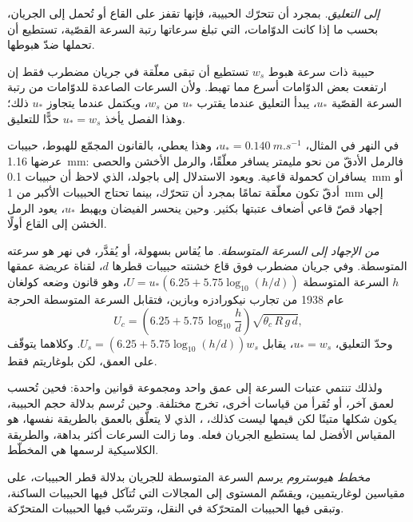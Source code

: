 \emph{إلى التعليق.} بمجرد أن تتحرّك الحبيبة، فإنها تقفز على القاع أو تُحمل إلى الجريان، بحسب ما إذا كانت الدوّامات، التي تبلغ سرعاتها رتبة السرعة القصّية، تستطيع أن تحملها ضدّ هبوطها.

\begin{proposition}\label{prop:b1:erosion-transport:suspension}
حبيبة ذات سرعة هبوط $w_s$ تستطيع أن تبقى معلّقة في جريان مضطرب فقط إن ارتفعت بعض الدوّامات أسرع مما تهبط. ولأن السرعات الصاعدة للدوّامات من رتبة السرعة القصّية $u_*$، يبدأ التعليق عندما يقترب $u_*$ من $w_s$، ويكتمل عندما يتجاوز $u_*$ ذلك؛ وهذا الفصل يأخذ $u_* = w_s$ حدًّا للتعليق.
\end{proposition}
\admitted

في النهر في المثال، $u_* = \qty{0.140}{m.s^{-1}}$، وهذا يعطي، بالقانون المجمّع للهبوط، حبيبات عرضها \qty{1.16}{mm}: فالرمل الأدقّ من نحو مليمتر يسافر معلّقًا، والرمل الأخشن والحصى يسافران كحمولة قاعية. ويعود الاستدلال إلى باجولد، الذي لاحظ أن حبيبات \qty{0.1}{mm} أو أدقّ تكون معلّقة تمامًا بمجرد أن تتحرّك، بينما تحتاج الحبيبات الأكبر من \qty{1}{mm} إلى إجهاد قصّ قاعي أضعاف عتبتها بكثير. وحين ينحسر الفيضان ويهبط $u_*$، يعود الرمل الخشن إلى القاع أولًا.

\emph{من الإجهاد إلى السرعة المتوسطة.} ما يُقاس بسهولة، أو يُقدَّر، في نهر هو سرعته المتوسطة. وفي جريان مضطرب فوق قاع خشنته حبيبات قطرها $d$، لقناة عريضة عمقها $h$ السرعة المتوسطة $U = u_*\left(6.25 + 5.75\log_{10}(h/d)\right)$، وهو قانون وضعه كولغان عام 1938 من تجارب نيكورادزه وبازين، فتقابل  السرعة المتوسطة الحرجة
\[
  U_c = \left(6.25 + 5.75\,\log_{10}\frac{h}{d}\right)\sqrt{\theta_c\,R\,g\,d},
\]
وحدّ التعليق، $u_* = w_s$، يقابل $U_s = \left(6.25 +
5.75\log_{10}(h/d)\right) w_s$. وكلاهما يتوقّف على العمق، لكن بلوغاريتم فقط.

ولذلك تنتمي عتبات السرعة إلى عمق واحد ومجموعة قوانين واحدة: فحين تُحسب لعمق آخر، أو تُقرأ من قياسات أخرى، تخرج مختلفة. وحين تُرسم بدلالة حجم الحبيبة، يكون شكلها متينًا لكن قيمها ليست كذلك، ، الذي لا يتعلّق بالعمق بالطريقة نفسها، هو المقياس الأفضل لما يستطيع الجريان فعله. وما زالت السرعات أكثر بداهة، والطريقة الكلاسيكية لرسمها هي المخطّط.

\begin{definition}\label{def:b1:erosion-transport:hjulstrom}
\emph{مخطط هيوستروم} يرسم السرعة المتوسطة للجريان بدلالة قطر الحبيبات، على مقياسين لوغاريتميين، ويقسّم المستوى إلى المجالات التي تُتآكل فيها الحبيبات الساكنة، وتبقى فيها الحبيبات المتحرّكة في النقل، وتترسّب فيها الحبيبات المتحرّكة.
\end{definition}


